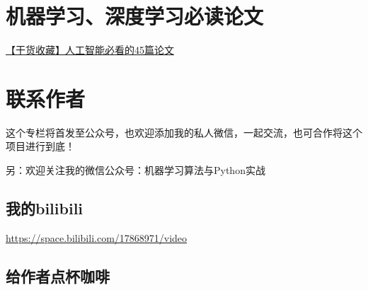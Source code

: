 \documentclass[
]{book}
\begin{document}
\hypertarget{ux673aux5668ux5b66ux4e60ux6df1ux5ea6ux5b66ux4e60ux5fc5ux8bfbux8bbaux6587}{%
\chapter{机器学习、深度学习必读论文}\label{ux673aux5668ux5b66ux4e60ux6df1ux5ea6ux5b66ux4e60ux5fc5ux8bfbux8bbaux6587}}

\href{https://mp.weixin.qq.com/s?__biz=MzA4MjYwMTc5Nw==\&mid=2648931036\&idx=2\&sn=400894afd88a44f5ec2f068ecc88b30a\&chksm=8794e8f6b0e361e0a518b6022669eb00c057690871814ac1d5e0cf5c926a689f7b4af54875fd\&token=2004915986\&lang=en_US\#rd}{【干货收藏】人工智能必看的45篇论文}

\hypertarget{ux8054ux7cfbux4f5cux8005}{%
\chapter{联系作者}\label{ux8054ux7cfbux4f5cux8005}}

这个专栏将首发至公众号，也欢迎添加我的私人微信，一起交流，也可合作将这个项目进行到底！

另：欢迎关注我的微信公众号：机器学习算法与Python实战

\hypertarget{ux6211ux7684bilibili}{%
\section{我的bilibili}\label{ux6211ux7684bilibili}}

\url{https://space.bilibili.com/17868971/video}

\hypertarget{ux7ed9ux4f5cux8005ux70b9ux676fux5496ux5561}{%
\section{给作者点杯咖啡}\label{ux7ed9ux4f5cux8005ux70b9ux676fux5496ux5561}}

  
\end{document}
